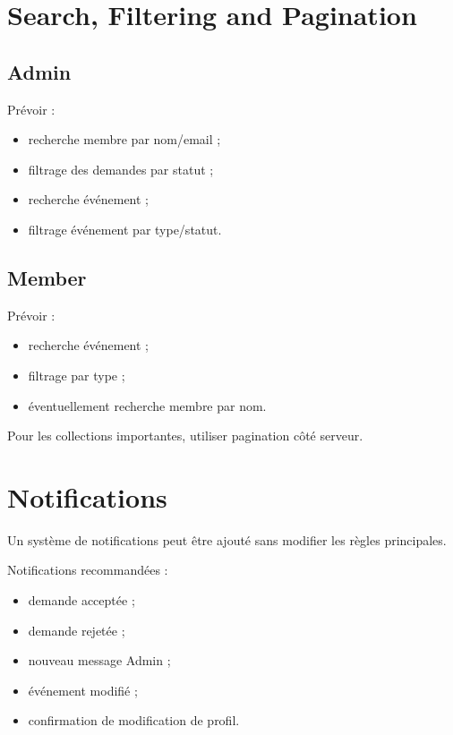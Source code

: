 \documentclass[11pt,a4paper]{report}
\begin{document}
\chapter{Search, Filtering and Pagination}

\section{Admin}

Prévoir :

\begin{itemize}
    \item recherche membre par nom/email ;
    \item filtrage des demandes par statut ;
    \item recherche événement ;
    \item filtrage événement par type/statut.
\end{itemize}

\section{Member}

Prévoir :

\begin{itemize}
    \item recherche événement ;
    \item filtrage par type ;
    \item éventuellement recherche membre par nom.
\end{itemize}

Pour les collections importantes, utiliser pagination côté serveur.

\chapter{Notifications}

Un système de notifications peut être ajouté sans modifier les règles principales.

Notifications recommandées :

\begin{itemize}
    \item demande acceptée ;
    \item demande rejetée ;
    \item nouveau message Admin ;
    \item événement modifié ;
    \item confirmation de modification de profil.
\end{itemize}
\end{document}
